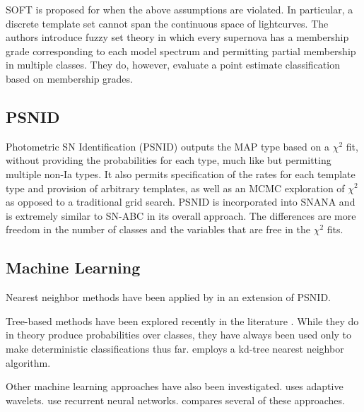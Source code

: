 \documentclass[12pt, onecolumn]{emulateapj}
\begin{document}
SOFT is proposed for when the above assumptions are violated.  In particular, a discrete template set cannot span the continuous space of lightcurves.  The authors introduce fuzzy set theory in which every supernova has a membership grade corresponding to each model spectrum and permitting partial membership in multiple classes.  They do, however, evaluate a point estimate classification based on membership grades.

\subsection{PSNID}

Photometric SN Identification (PSNID) \citep{Sako11} outputs the MAP type based on a $\chi^{2}$ fit, without providing the probabilities for each type, much like \citet{Poznanski06} but permitting multiple non-Ia types.  It also permits specification of the rates for each template type and provision of arbitrary templates, as well as an MCMC exploration of $\chi^{2}$ as opposed to a traditional grid search.  PSNID is incorporated into SNANA and is extremely similar to SN-ABC in its overall approach.  The differences are more freedom in the number of classes and the variables that are free in the $\chi^{2}$ fits.

\subsection{Machine Learning}

Nearest neighbor methods have been applied by \citet{Sako14} in an extension of PSNID.

Tree-based methods have been explored recently in the literature \citep{Richards11, Sako14, Lochner16, Moller16}.  While they do in theory produce probabilities over classes, they have always been used only to make deterministic classifications thus far.  \citet{Sako14} employs a kd-tree nearest neighbor algorithm.

Other machine learning approaches have also been investigated.  \citet{Varughese15} uses adaptive wavelets.  \citet{Karpenka12, Charnock16} use recurrent neural networks.  \citet{Lochner16} compares several of these approaches.




\end{document}
